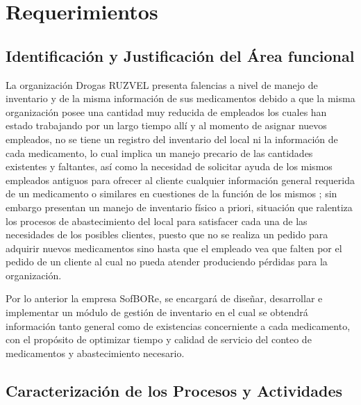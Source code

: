 \chapter{Requerimientos}
\section{Identificaci\'on y Justificaci\'on del \'Area funcional}
La organización Drogas RUZVEL presenta falencias a nivel de manejo de inventario y de la misma información de sus medicamentos debido a que la misma organización posee una cantidad muy reducida de empleados los cuales han estado trabajando por un largo tiempo allí y al momento de asignar nuevos empleados, no se tiene un registro del inventario del local ni la información de cada medicamento, lo cual implica un manejo precario de las cantidades existentes y faltantes, así como la necesidad de solicitar ayuda de los mismos empleados antiguos para ofrecer al cliente cualquier información general requerida de un medicamento o similares en cuestiones de la función de los mismos ; sin embargo presentan un manejo de inventario físico a priori, situación que ralentiza los procesos de abastecimiento del local para satisfacer cada una de las necesidades de los posibles clientes, puesto que no se realiza un pedido para adquirir nuevos medicamentos sino hasta que el empleado vea que falten por el pedido de un cliente al cual no pueda atender produciendo pérdidas para la organización. 

Por lo anterior la empresa SofBORe, se encargará de diseñar, desarrollar e implementar un módulo de gestión de inventario en el cual se obtendrá información tanto general como de existencias concerniente a cada medicamento, con el propósito de optimizar tiempo y calidad de servicio del conteo de medicamentos y abastecimiento necesario.

\section{Caracterizaci\'on de los Procesos y Actividades}


